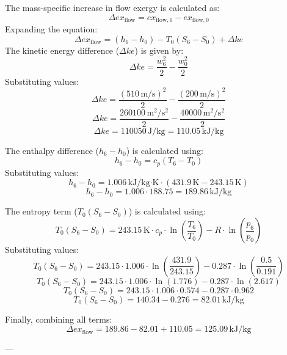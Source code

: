 The mass-specific increase in flow exergy is calculated as:  
\[
\Delta ex_{\text{flow}} = ex_{\text{flow},6} - ex_{\text{flow},0}
\]  
Expanding the equation:  
\[
\Delta ex_{\text{flow}} = (h_6 - h_0) - T_0(S_6 - S_0) + \Delta ke
\]  
The kinetic energy difference (\( \Delta ke \)) is given by:  
\[
\Delta ke = \frac{w_6^2}{2} - \frac{w_0^2}{2}
\]  
Substituting values:  
\[
\Delta ke = \frac{(510 \, \text{m/s})^2}{2} - \frac{(200 \, \text{m/s})^2}{2}
\]  
\[
\Delta ke = \frac{260100 \, \text{m}^2/\text{s}^2}{2} - \frac{40000 \, \text{m}^2/\text{s}^2}{2}
\]  
\[
\Delta ke = 110050 \, \text{J/kg} = 110.05 \, \text{kJ/kg}
\]  

The enthalpy difference (\( h_6 - h_0 \)) is calculated using:  
\[
h_6 - h_0 = c_p(T_6 - T_0)
\]  
Substituting values:  
\[
h_6 - h_0 = 1.006 \, \text{kJ/kg·K} \cdot (431.9 \, \text{K} - 243.15 \, \text{K})
\]  
\[
h_6 - h_0 = 1.006 \cdot 188.75 = 189.86 \, \text{kJ/kg}
\]  

The entropy term (\( T_0(S_6 - S_0) \)) is calculated using:  
\[
T_0(S_6 - S_0) = 243.15 \, \text{K} \cdot c_p \cdot \ln\left(\frac{T_6}{T_0}\right) - R \cdot \ln\left(\frac{p_6}{p_0}\right)
\]  
Substituting values:  
\[
T_0(S_6 - S_0) = 243.15 \cdot 1.006 \cdot \ln\left(\frac{431.9}{243.15}\right) - 0.287 \cdot \ln\left(\frac{0.5}{0.191}\right)
\]  
\[
T_0(S_6 - S_0) = 243.15 \cdot 1.006 \cdot \ln(1.776) - 0.287 \cdot \ln(2.617)
\]  
\[
T_0(S_6 - S_0) = 243.15 \cdot 1.006 \cdot 0.574 - 0.287 \cdot 0.962
\]  
\[
T_0(S_6 - S_0) = 140.34 - 0.276 = 82.01 \, \text{kJ/kg}
\]  

Finally, combining all terms:  
\[
\Delta ex_{\text{flow}} = 189.86 - 82.01 + 110.05 = 125.09 \, \text{kJ/kg}
\]  

---
